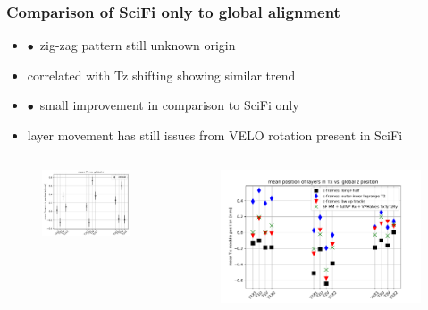 \documentclass[aspectratio=1610, 12pt, xcolor=dvipsnames]{beamer}
\begin{document}
\begin{frame}\frametitle{Comparison of SciFi only to global alignment}
  \begin{itemize}
    \setlength\itemsep{0em}
    \item $\bullet$\, zig-zag pattern still unknown origin
    \item \to correlated with Tz shifting showing similar trend
    \item $\bullet$\, small improvement in comparison to SciFi only
    \item \to layer movement has still issues from VELO rotation present in SciFi
  \end{itemize}
  \begin{columns}
    \begin{column}[c]{0.35\textwidth}
      \begin{figure}
        \centering
        \includegraphics[width=\textwidth]{plots/outfiles_vs_global/Layers_Tx_pattern.png}
      \end{figure}
    \end{column}
    \begin{column}[c]{0.5\textwidth}
      \begin{figure}
        \centering
        \includegraphics[width=\textwidth]{plots/outfiles_vs_global/all_runs_fix_glob_z_vs_local_Tx.pdf}

\end{figure}
\end{column}
\end{columns}
\end{frame}
\end{document}
